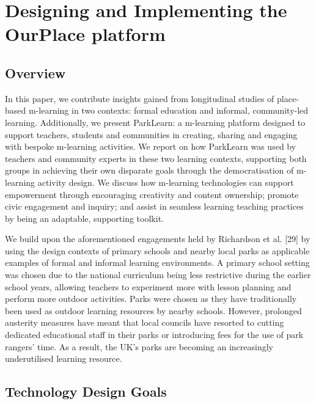 \chapter{Designing and Implementing the OurPlace platform}
\label{chap:Design}

\section{Overview}
In this paper, we contribute insights gained from longitudinal studies of place-based m-learning in two contexts: formal education and informal, community-led learning. Additionally, we present ParkLearn: a m-learning platform designed to support teachers, students and communities in creating, sharing and engaging with bespoke m-learning activities. We report on how ParkLearn was used by teachers and community experts in these two learning contexts, supporting both groups in achieving their own disparate goals through the democratisation of m-learning activity design. We discuss how m-learning technologies can support empowerment through encouraging creativity and content ownership; promote civic engagement and inquiry; and assist in seamless learning teaching practices by being an adaptable, supporting toolkit.

We build upon the aforementioned engagements held by Richardson et al. [29] by using the design contexts of primary schools and nearby local parks as applicable examples of formal and informal learning environments. A primary school setting was chosen due to the national curriculum being less restrictive during the earlier school years, allowing teachers to experiment more with lesson planning and perform more outdoor activities. Parks were chosen as they have traditionally been used as outdoor learning resources by nearby schools. However, prolonged austerity measures have meant that local councils have resorted to cutting dedicated educational staff in their parks or introducing fees for the use of park rangers’ time. As a result, the UK’s parks are becoming an increasingly underutilised learning resource.

\section{Technology Design Goals}

